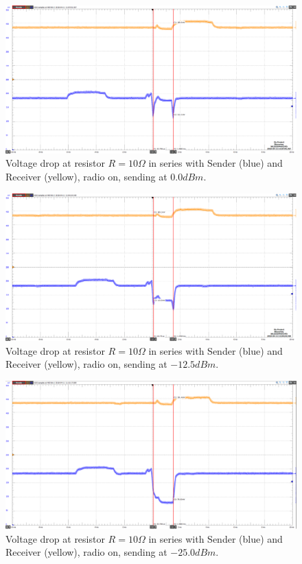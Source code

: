 \begin{figure}[h]
	\centering
	\includegraphics[width=0.8\linewidth]{implementation/energylab/fig/radioOn_sendHighSignal.png}
	\caption{Voltage drop at resistor $R=10\Omega$ in series with Sender (blue) and Receiver (yellow), radio on, sending at $0.0dBm$.}
	\label{fig:radioOn_sendHighSignal}
\end{figure}

\begin{figure}[h]
	\centering
	\includegraphics[width=0.8\linewidth]{implementation/energylab/fig/radioOn_sendMidSignal.png}
	\caption{Voltage drop at resistor $R=10\Omega$ in series with Sender (blue) and Receiver (yellow), radio on, sending at $-12.5dBm$.}
	\label{fig:radioOn_sendMidSignal}
\end{figure}

\begin{figure}[h]
	\centering
	\includegraphics[width=0.8\linewidth]{implementation/energylab/fig/radioOn_sendLowSignal.png}
	\caption{Voltage drop at resistor $R=10\Omega$ in series with Sender (blue) and Receiver (yellow), radio on, sending at $-25.0dBm$.}
	\label{fig:radioOn_sendLowSignal}
\end{figure}


